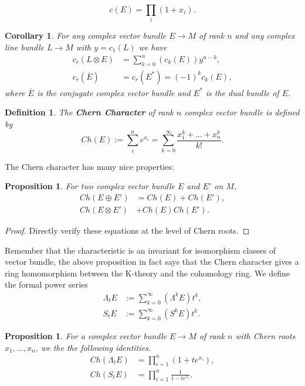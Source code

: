 \documentclass[11pt]{article}
\newtheorem{prop}[thm]{Proposition}
\newtheorem{cor}[thm]{Corollary}
\newtheorem{dfn}[thm]{Definition}
\begin{document}
	\begin{equation*}
		c(E)=\prod_i(1+x_i).
	\end{equation*}
	\begin{cor}
		For  any complex vector bundle $E\rightarrow M$ of rank $n$ and any complex line bundle $L\rightarrow M$ with $y=c_1(L)$ we have
		\begin{equation*}
		\begin{aligned}
			c_r(L\otimes E) &=\sum^n_{k=0}(c_k(E))y^{n-k},\\
			c_r(\overline{E}) &=c_r(E^*)=(-1)^k c_k(E),
		\end{aligned}
		\end{equation*}
		where $\overline{E}$ is the conjugate complex vector bundle and $E^*$ is the dual bundle of $E$.
		\end{cor}
		\begin{dfn}
			The \textbf{Chern Character} of rank $n$ complex vector bundle is defined by
			\begin{equation*}
				Ch(E):=\sum^n_i e^{x_i}=\sum^\infty_{k=0}\frac{x_1^k+...+x_n^k}{k!}.
			\end{equation*}
		\end{dfn}
		The Chern character has many nice properties:
		\begin{prop}
			For two complex vector bundle $E$ and $E'$ on $M$,
			\begin{equation*}
			\begin{aligned}
				Ch(E\oplus E')&=Ch(E)+Ch(E'),\\
				Ch(E\otimes E')&+Ch(E)Ch(E').
			\end{aligned}
			\end{equation*}
		\end{prop}
		\begin{proof}
		Directly verify these equations at the level of Chern roots.
		\end{proof}
		Remember that the characteristic is an invariant for isomorphism classes of vector bundle, the above proposition in fact says that the Chern character gives a ring homomorphism between the K-theory and the cohomology ring.
		We define the formal power series
		\begin{equation*}
		\begin{aligned}
			\Lambda_t E&:=\sum^\infty_{k=0}(\Lambda^k E) t^k,\\
			S_t E&:=\sum^\infty_{k=0}(S^k E)t^k.
		\end{aligned}
		\end{equation*} 
		\begin{prop}
			For a complex vector bundle $E\rightarrow M$ of rank $n$ with Chern roots $x_1,...,x_n$, we the the following identities.
			\begin{equation*}
			\begin{aligned}
				Ch(\Lambda_t E)&=\prod^n_{i=1}(1+t e^{x_i}),\\
				Ch(S_t E)&=\prod^n_{i=1}\frac{1}{1-t e^{x_i}}.
			\end{aligned}
			\end{equation*}
		\end{prop}
\end{document}

